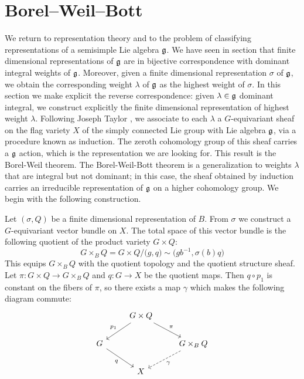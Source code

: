 \section{Borel--Weil--Bott}
We return to representation theory and to the problem of classifying representations of a semisimple Lie algebra
$\mathfrak g$. We have seen in section  that finite dimensional representations of $\mathfrak g$ are in
bijective correspondence with dominant integral weights of $\mathfrak g$. Moreover, given a finite dimensional representation
$\sigma$ of $\mathfrak g$, we obtain the corresponding weight $\lambda$ of $\mathfrak g$ as the highest weight of $\sigma$.
In this section we make explicit the reverse correspondence: given $\lambda \in \mathfrak g$ dominant integral, we construct
explicitly the finite dimensional representation of highest weight $\lambda$. Following Joseph Taylor , we associate to each $\lambda$ a $G$-equivariant sheaf on the flag variety $X$ of the simply connected Lie group 
with Lie algebra $\mathfrak g$, via a procedure known as induction. The zeroth cohomology
group of this sheaf carries a $\mathfrak g$ action, which is the representation we are looking for. This 
result is the Borel-Weil theorem. The Borel-Weil-Bott theorem is a generalization to weights $\lambda$ that are
integral but not dominant; in this case, the sheaf obtained by induction carries an irreducible representation of $\mathfrak g$
on a higher cohomology group. We begin with the following construction.

Let $(\sigma, Q)$ be a finite dimensional representation of $B$. From $\sigma$ we construct a $G$-equivariant
vector bundle on $X$.  The total space of
this vector bundle is the following quotient of the product variety $G\times Q$:
\begin{equation}
G\times_B Q = G\times Q / \big(g,q\big) \sim \big(gb^{-1} , \sigma(b) q\big)
\end{equation}
This equips $G\times_B Q$ with the quotient topology and the quotient structure sheaf. Let $\pi: G\times Q \to 
G\times_B Q$ and $q : G \to X$ be the quotient maps. Then $q \circ p_1$ is constant on the fibers of $\pi$,
so there exists a map $\gamma$ which makes the following diagram commute:
\[
\begin{tikzcd}
\; & G \times Q\arrow[swap]{dl}{p_1}\arrow{dr}{\pi} & \\
G\arrow[swap]{dr}{q} & & G\times_B Q\arrow[dashed]{dl}{\gamma} \\
 & X & 
\end{tikzcd}
\]

